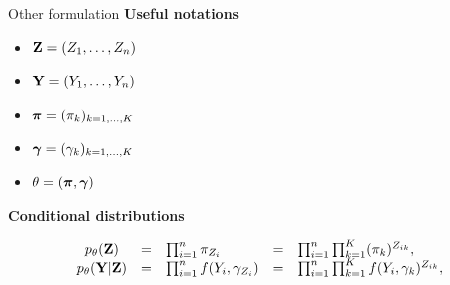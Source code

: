 \documentclass[compress,10pt]{beamer}
\begin{document}
\begin{frame}{Other formulation}
\textbf{\color{dgreen} Useful notations}
\begin{itemize}
 \item $\mathbf{Z} = (Z_1, \dots, Z_n)$
 \item $\mathbf{Y}  = (Y_1,\dots, Y_n)$
 \item $\boldsymbol{\pi} = (\pi_k)_{k=1, \dots,K}$
 \item $\boldsymbol{\gamma} = (\gamma_k)_{k=1, \dots,K}$
 \item $\theta  = (\boldsymbol{\pi},\boldsymbol{\gamma})$
\end{itemize}

\vspace{2em}

\textbf{\color{dgreen} Conditional distributions}

$$
\begin{array}{cclcll}
   p_\theta(\mathbf{Z}) & = &  \prod_{i=1}^n \pi_{Z_i} &=&  \prod_{i=1}^n \prod_{k=1}^{K}  (\pi_k)^{Z_{ik}}, \\
  p_\theta(\mathbf{Y}|\mathbf{Z}) & = & \prod_{i=1}^n f(Y_i, \gamma_{Z_i})  &=& \prod_{i=1}^n \prod_{k=1}^{K} f(Y_i, \gamma_k)^{Z_{ik}}, 
\end{array}
$$
\end{frame}
\end{document}
